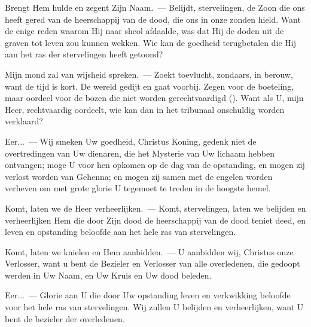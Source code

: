 \documentclass[12pt,twoside,a5paper]{article}
\begin{document}
\begin{halfparskip}
   Brengt Hem hulde en zegent Zijn Naam.~--- Belijdt, stervelingen, de Zoon die ons heeft gered van de heerschappij van de dood, die ons in onze zonden hield. Want de enige reden waarom Hij naar sheol afdaalde, was dat Hij de doden uit de graven tot leven zou kunnen wekken. Wie kan de goedheid terugbetalen die Hij aan het ras der stervelingen heeft getoond?

  Mijn mond zal van wijsheid spreken.~--- Zoekt toevlucht, zondaars, in berouw, want de tijd is kort. De wereld gedijt en gaat voorbij. Zegen voor de boeteling, maar oordeel voor de bozen die niet worden gerechtvaardigd (). Want als U, mijn Heer, rechtvaardig oordeelt, wie kan dan in het tribunaal onschuldig worden verklaard?

  Eer...~--- Wij smeken Uw goedheid, Christus Koning, gedenk niet de overtredingen van Uw dienaren, die het Mysterie van Uw lichaam hebben ontvangen; moge U voor hen opkomen op de dag van de opstanding, en mogen zij verlost worden van Gehenna; en mogen zij samen met de engelen worden verheven om met grote glorie U tegemoet te treden in de hoogste hemel.
\end{halfparskip}

\begin{halfparskip}
   Komt, laten we de Heer verheerlijken.~--- Komt, stervelingen, laten we belijden en verheerlijken Hem die door Zijn dood de heerschappij van de dood teniet deed, en leven en opstanding beloofde aan het hele ras van stervelingen.

  Komt, laten we knielen en Hem aanbidden.~--- U aanbidden wij, Christus onze Verlosser, want u bent de Bezieler en Verlosser van alle overledenen, die gedoopt werden in Uw Naam, en Uw Kruis en Uw dood beleden.

  Eer...~--- Glorie aan U die door Uw opstanding leven en verkwikking beloofde voor het hele ras van
  stervelingen. Wij zullen U belijden en verheerlijken, want U bent de bezieler der overledenen.
\end{halfparskip}
\end{document}
